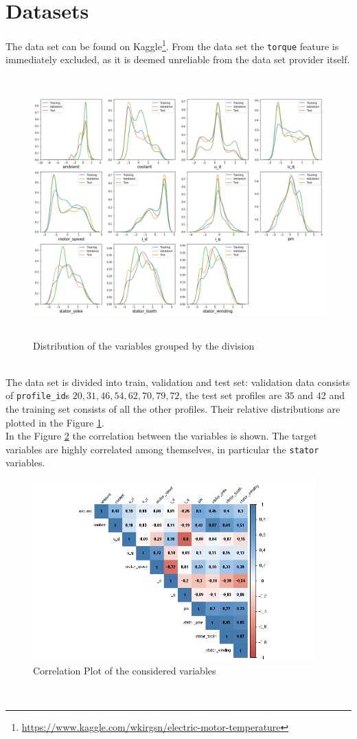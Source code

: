 \section{Datasets}
The data set can be found on Kaggle\footnote{\href{https://www.kaggle.com/wkirgsn/electric-motor-temperature}{https://www.kaggle.com/wkirgsn/electric-motor-temperature}}.
From the data set the \verb|torque| feature is immediately excluded, as it is deemed unreliable from the data set provider itself.
\begin{figure}[!h]
    \centering
    \includegraphics[width=\linewidth, height=10cm]{imgs/dist_plot.png}
    \caption{Distribution of the variables grouped by the division}
    \label{fig:dist_plot}
\end{figure}\\
The data set is divided into train, validation and test set: validation data consists of \verb|profile_id|s $20, 31, 46, 54, 62, 70, 79, 72$, the test set profiles are $35$ and $42$ and the training set consists of all the other profiles.
Their relative distributions are plotted in the Figure \ref{fig:dist_plot}.\\
In the Figure \ref{fig:corrplot} the correlation between the variables is shown.
The target variables are highly correlated among themselves, in particular the \verb|stator| variables.
\begin{figure}[!h]
    \centering
    \includegraphics[width=\linewidth, height=7cm]{imgs/corrplot.png}
    \caption{Correlation Plot of the considered variables}
    \label{fig:corrplot}
\end{figure}\\

